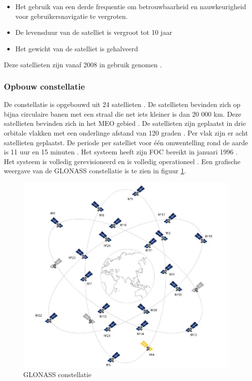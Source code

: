 \begin{itemize}
	\item Het gebruik van een derde frequentie om betrouwbaarheid en nauwkeurigheid voor gebruikersnavigatie te vergroten.
	\item De levensduur van de satelliet is vergroot tot 10 jaar
	\item Het gewicht van de satelliet is gehalveerd
\end{itemize}
Deze satellieten zijn vanaf 2008 in gebruik genomen \cite{LBibPPP}.

\subsubsection{Opbouw constellatie} 
De constellatie is opgebouwd uit 24 satellieten \cite{LBibGNSS4}. De satellieten bevinden zich op bijna circulaire banen met een straal die net iets kleiner is dan 20 000 km. Deze satellieten bevinden zich in het MEO gebied \cite{LBibMEO}. De satellieten zijn geplaatst in drie orbitale vlakken met een onderlinge afstand van 120 graden \cite{LBibGLONASS2,LBibGNSS6, LBibGNSS8}. Per vlak zijn er acht satellieten geplaatst. De periode per satelliet voor \'e\'en omwentelling rond de aarde is 11 uur en 15 minuten \cite{LBibGNSS6}.  Het systeem heeft zijn FOC bereikt in januari 1996 \cite{LBibGLONASS}. Het systeem is volledig gerevisioneerd en is volledig operationeel \cite{LBibGNSS4}. Een grafische weergave van de GLONASS constellatie is te zien in figuur \ref{imgGLONASS}.

\begin{figure}[hpb]
	\includegraphics[scale=0.5]{GLONASS.jpg}
	\caption{GLONASS constellatie \cite{LImgGLONASS}}
	\label{imgGLONASS}
\end{figure}

